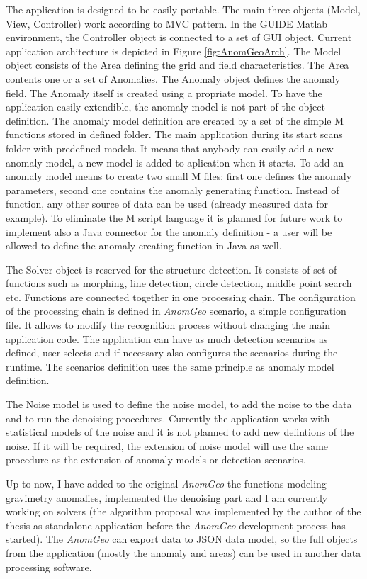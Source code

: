 \documentclass[FM]{tulthesis}
\begin{document}
The application is designed to be easily portable. The main three objects (Model, View, Controller) work according to MVC pattern. In the GUIDE Matlab environment, the Controller object is connected to a set of GUI object. Current application architecture is depicted in Figure \ref{fig:AnomGeoArch}. The Model object consists of the Area defining the grid and field characteristics. The Area contents one or a set of Anomalies. The Anomaly object defines the anomaly field. The Anomaly itself is created using a propriate model. To have the application easily extendible, the anomaly model is not part of the object definition. The anomaly model definition are created by a set of the simple M functions stored in defined folder. The main application during its start scans folder with predefined models. It means that anybody can easily add a new anomaly model, a new model is added to aplication when it starts. To add an anomaly model means to create two small M files: first one defines the anomaly parameters, second one contains the anomaly generating function. Instead of function, any other source of data can be used (already measured data for example). To eliminate the M script language it is planned for future work to implement also a Java connector for the anomaly definition - a user will be allowed to define the anomaly creating function in Java as well.

The Solver object is reserved for the structure detection. It consists of set of functions such as morphing, line detection, circle detection, middle point search etc. Functions are connected together in one processing chain. The configuration of the processing chain is defined in \emph{AnomGeo} scenario, a simple configuration file. It allows to modify the recognition process without changing the main application code. The application can have as much detection scenarios as defined, user selects and if necessary also configures the scenarios during the runtime. The scenarios definition uses the same principle as anomaly model definition.

The Noise model is used to define the noise model, to add the noise to the data and to run the denoising procedures. Currently the application works with statistical models of the noise and it is not planned to add new defintions of the noise. If it will be required, the extension of noise model will use the same procedure as the extension of anomaly models or detection scenarios.

Up to now, I have added to the original \emph{AnomGeo} the functions modeling gravimetry anomalies, implemented the denoising part and I am currently working on solvers (the algorithm proposal was implemented by the author of the thesis as standalone application before the \emph{AnomGeo} development process has started). The \emph{AnomGeo} can export data to JSON data model, so the full objects from the application (mostly the anomaly and areas) can be used in another data processing software.
\end{document}
